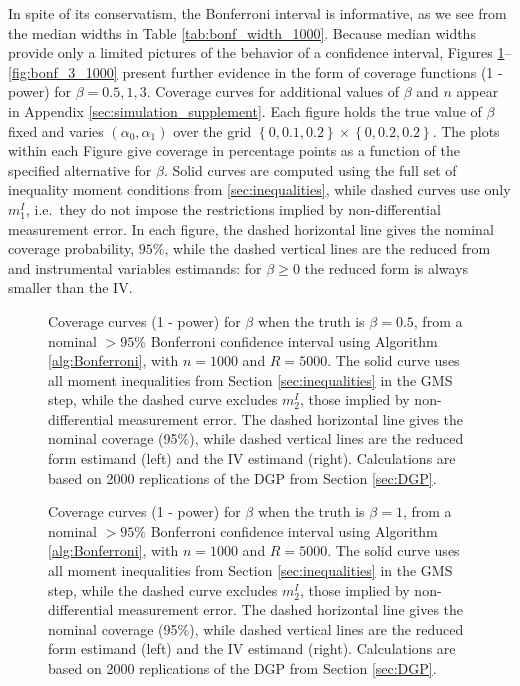 In spite of its conservatism, the Bonferroni interval is informative, as we see from the median widths in Table \ref{tab:bonf_width_1000}. 
Because median widths provide only a limited pictures of the behavior of a confidence interval, Figures \ref{fig:bonf_point5_1000}--\ref{fig:bonf_3_1000} present further evidence in the form of coverage functions (1 - power) for $\beta = 0.5, 1, 3$.
Coverage curves for additional values of $\beta$ and $n$ appear in Appendix \ref{sec:simulation_supplement}. 
Each figure holds the true value of $\beta$ fixed and varies $(\alpha_0, \alpha_1)$ over the grid $\left\{ 0, 0.1, 0.2 \right\}\times \left\{ 0, 0.2, 0.2 \right\}$. 
The plots within each Figure give coverage in percentage points as a function of the specified alternative for $\beta$.
Solid curves are computed using the full set of inequality moment conditions from \ref{sec:inequalities}, while dashed curves use only $m_{1}^I$, i.e.\ they do not impose the restrictions implied by non-differential measurement error.
In each figure, the dashed horizontal line gives the nominal coverage probability, $95\%$, while the dashed vertical lines are the reduced from  and instrumental variables estimands: for $\beta \geq 0$ the reduced form is always smaller than the IV.


\begin{figure}[h]
  \centering
  
  \caption{Coverage curves (1 - power) for $\beta$ when the truth is $\beta = 0.5$, from a nominal $>95\%$ Bonferroni confidence interval using Algorithm \ref{alg:Bonferroni}, with $n = 1000$ and $R = 5000$. The solid curve uses all moment inequalities from Section \ref{sec:inequalities} in the GMS step, while the dashed curve excludes $m_{2}^I$, those implied by non-differential measurement error. The dashed horizontal line gives the nominal coverage (95\%), while dashed vertical lines are the reduced form estimand (left) and the IV estimand (right). Calculations are based on 2000 replications of the DGP from Section \ref{sec:DGP}.}
  \label{fig:bonf_point5_1000}
\end{figure}

\begin{figure}[h]
  \centering
  \caption{Coverage curves (1 - power) for $\beta$ when the truth is $\beta = 1$, from a nominal $>95\%$ Bonferroni confidence interval using Algorithm \ref{alg:Bonferroni}, with $n = 1000$ and $R = 5000$. The solid curve uses all moment inequalities from Section \ref{sec:inequalities} in the GMS step, while the dashed curve excludes $m_{2}^I$, those implied by non-differential measurement error. The dashed horizontal line gives the nominal coverage (95\%), while dashed vertical lines are the reduced form estimand (left) and the IV estimand (right). Calculations are based on 2000 replications of the DGP from Section \ref{sec:DGP}.}
  \label{fig:bonf_1_1000}
\end{figure}

